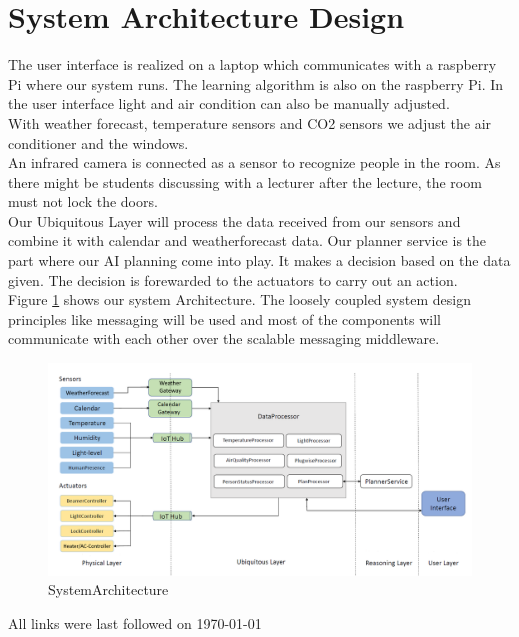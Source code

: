 \documentclass[runningheads]{llncs}
\begin{document}
\section{System Architecture Design}
The user interface is realized on a laptop which communicates with a raspberry Pi where our system runs. The learning algorithm is also on the raspberry Pi. In the user interface light and air condition can also be manually adjusted.\\
With weather forecast, temperature sensors and CO2 sensors we adjust the air conditioner and the windows. \\
An infrared camera is connected as a sensor to recognize people in the room. As there might be students discussing with a lecturer after the lecture, the room must not lock the doors. \\
Our Ubiquitous Layer will process the data received from our sensors and combine it with calendar and weatherforecast data. Our planner service is the part where our AI planning come into play. It makes a decision based on the data given. The decision is forewarded to the actuators to carry out an action.\\

Figure \ref{fig:SystemArchitecture} shows our system Architecture. The loosely coupled system design principles like messaging will be used and most of the components will communicate with each other over the scalable messaging middleware.\\

\begin{figure}[H]
\centering
\includegraphics[width=1.0\textwidth]{../img/IotDiagram.png}
\caption{SystemArchitecture}
\label{fig:SystemArchitecture}
\end{figure}







%
%



All links were last followed on \today
\end{document}
